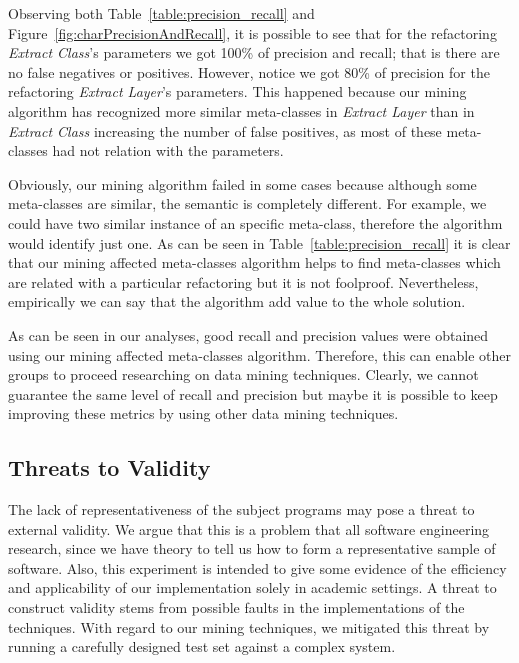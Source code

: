 Observing  both Table~\ref{table:precision_recall} and Figure~\ref{fig:charPrecisionAndRecall}, it is possible to see that for the refactoring \textit{Extract Class}'s parameters we got 100\% of precision and recall; that is there are no false negatives or positives. However, notice we got 80\% of precision for the refactoring \textit{Extract Layer}'s parameters. This happened because our mining algorithm has recognized more similar meta-classes in \textit{Extract Layer} than in \textit{Extract Class} increasing the number of false positives, as most of these meta-classes had not relation with the parameters.

Obviously, our mining algorithm failed in some cases because although some meta-classes are similar, the semantic is completely different. For example, we could have two similar instance of an specific meta-class, therefore the algorithm would identify just one. %
As can be seen in Table~\ref{table:precision_recall} it is clear that our mining affected meta-classes algorithm helps to find meta-classes which are related with a particular refactoring but it is not foolproof. Nevertheless, empirically we can say that the algorithm add value to the whole solution.

As can be seen in our analyses, good recall and precision values were obtained using our mining affected meta-classes algorithm. Therefore, this can enable other groups to proceed researching on data mining techniques. Clearly, we cannot guarantee the same level of recall and precision but maybe it is possible to keep improving these metrics by using other data mining techniques.

\subsection{Threats to Validity}

The lack of representativeness of the subject programs may pose a threat to external validity. We argue that this is a problem that all software engineering research, since we have theory to tell us how to form a representative sample of software. %
Also, this experiment is intended to give some evidence of the efficiency and applicability of our implementation solely in academic settings. A threat to construct validity stems from possible faults in the implementations of the techniques. With regard to our mining techniques, we mitigated this threat by running a carefully designed test set against a complex system.